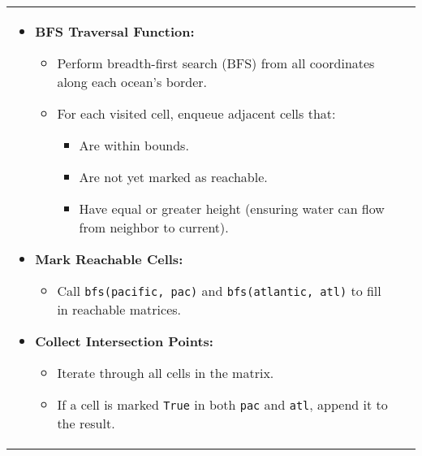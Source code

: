 \begin{summary}
\begin{center}
\begin{tabular}{ll}
{\begin{itemize}
                    \item \textbf{BFS Traversal Function:}
                    \begin{itemize}
                        \item Perform breadth-first search (BFS) from all coordinates along each ocean's border.
                        \item For each visited cell, enqueue adjacent cells that:
                        \begin{itemize}
                            \item Are within bounds.
                            \item Are not yet marked as reachable.
                            \item Have equal or greater height (ensuring water can flow from neighbor to current).
                        \end{itemize}
                    \end{itemize}
                
                    \item \textbf{Mark Reachable Cells:}
                    \begin{itemize}
                        \item Call \texttt{bfs(pacific, pac)} and \texttt{bfs(atlantic, atl)} to fill in reachable matrices.
                    \end{itemize}
                
                    \item \textbf{Collect Intersection Points:}
                    \begin{itemize}
                        \item Iterate through all cells in the matrix.
                        \item If a cell is marked \texttt{True} in both \texttt{pac} and \texttt{atl}, append it to the result.
                    \end{itemize}
                

\end{itemize}}
\end{tabular}
\end{center}
\end{summary}
